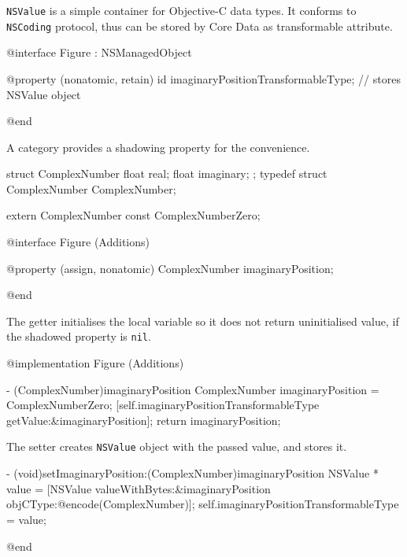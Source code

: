\documentclass[10pt]{extarticle}
\newcommand{\inlinecode}[1]{{\textcolor{TundoraColor}{\texttt{#1}}}}
\begin{document}
\inlinecode{NSValue} is a simple container for Objective-C data types. It conforms to \inlinecode{NSCoding} protocol, thus can be stored by Core Data as transformable attribute. 

\begin{codelisting}
@interface Figure : NSManagedObject

@property (nonatomic, retain) id imaginaryPositionTransformableType;       // stores NSValue object

@end
\end{codelisting}

A category provides a shadowing property for the convenience.

\begin{codelisting}
struct ComplexNumber {
    float real;
    float imaginary;
};
typedef struct ComplexNumber ComplexNumber;

extern ComplexNumber const ComplexNumberZero;


@interface Figure (Additions)

@property (assign, nonatomic) ComplexNumber imaginaryPosition;

@end
\end{codelisting}

The getter initialises the local variable so it does not return uninitialised value, if the shadowed property is \inlinecode{nil}.

\begin{codelisting}
@implementation Figure (Additions)

- (ComplexNumber)imaginaryPosition
{
    ComplexNumber imaginaryPosition = ComplexNumberZero;
    [self.imaginaryPositionTransformableType getValue:&imaginaryPosition];
    return imaginaryPosition;
}
\end{codelisting}

The setter creates \inlinecode{NSValue} object with the passed value, and stores it.

\begin{codelisting}
- (void)setImaginaryPosition:(ComplexNumber)imaginaryPosition
{
    NSValue * value = [NSValue valueWithBytes:&imaginaryPosition objCType:@encode(ComplexNumber)];
    self.imaginaryPositionTransformableType = value;
}

@end
\end{codelisting}
\end{document}

